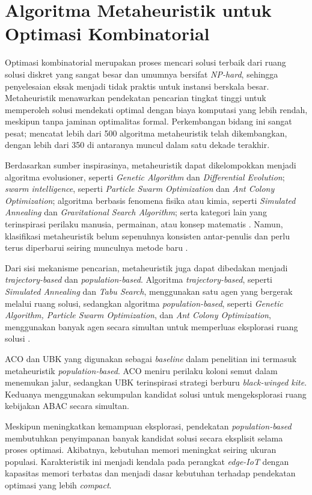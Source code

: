 \section{Algoritma Metaheuristik untuk Optimasi Kombinatorial}

Optimasi kombinatorial merupakan proses mencari solusi terbaik dari ruang solusi diskret yang sangat besar dan umumnya bersifat \textit{NP-hard}, sehingga penyelesaian eksak menjadi tidak praktis untuk instansi berskala besar.
Metaheuristik menawarkan pendekatan pencarian tingkat tinggi untuk memperoleh solusi mendekati optimal dengan biaya komputasi yang lebih rendah, meskipun tanpa jaminan optimalitas formal.
Perkembangan bidang ini sangat pesat; \textcite{rajwar_exhaustive_2023} mencatat lebih dari 500 algoritma metaheuristik telah dikembangkan, dengan lebih dari 350 di antaranya muncul dalam satu dekade terakhir.

Berdasarkan sumber inspirasinya, metaheuristik dapat dikelompokkan menjadi algoritma evolusioner, seperti \textit{Genetic Algorithm} dan \textit{Differential Evolution}; \textit{swarm intelligence}, seperti \textit{Particle Swarm Optimization} dan \textit{Ant Colony Optimization}; algoritma berbasis fenomena fisika atau kimia, seperti \textit{Simulated Annealing} dan \textit{Gravitational Search Algorithm}; serta kategori lain yang terinspirasi perilaku manusia, permainan, atau konsep matematis \parencite{rajwar_exhaustive_2023}.
Namun, klasifikasi metaheuristik belum sepenuhnya konsisten antar-penulis dan perlu terus diperbarui seiring munculnya metode baru \parencite{jaksic_comprehensive_2023}.

Dari sisi mekanisme pencarian, metaheuristik juga dapat dibedakan menjadi \textit{trajectory-based} dan \textit{population-based}.
Algoritma \textit{trajectory-based}, seperti \textit{Simulated Annealing} dan \textit{Tabu Search}, menggunakan satu agen yang bergerak melalui ruang solusi, sedangkan algoritma \textit{population-based}, seperti \textit{Genetic Algorithm, Particle Swarm Optimization}, dan \textit{Ant Colony Optimization}, menggunakan banyak agen secara simultan untuk memperluas eksplorasi ruang solusi \parencite{rajwar_exhaustive_2023}.

ACO dan UBK yang digunakan sebagai \textit{baseline} dalam penelitian ini termasuk metaheuristik \textit{population-based}.
ACO meniru perilaku koloni semut dalam menemukan jalur, sedangkan UBK terinspirasi strategi berburu \textit{black-winged kite}.
Keduanya menggunakan sekumpulan kandidat solusi untuk mengeksplorasi ruang kebijakan ABAC secara simultan.

Meskipun meningkatkan kemampuan eksplorasi, pendekatan \textit{population-based} membutuhkan penyimpanan banyak kandidat solusi secara eksplisit selama proses optimasi.
Akibatnya, kebutuhan memori meningkat seiring ukuran populasi.
Karakteristik ini menjadi kendala pada perangkat \textit{edge-IoT} dengan kapasitas memori terbatas dan menjadi dasar kebutuhan terhadap pendekatan optimasi yang lebih \textit{compact}.
